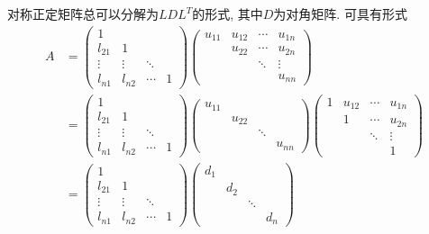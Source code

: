 \documentclass[hidelinks]{ctexart}
\begin{document}
对称正定矩阵总可以分解为$LDL^T$的形式, 其中$D$为对角矩阵. 可具有形式
\begin{align*}
    A &= \begin{pmatrix}
        1 & & & \\
        l_{21} & 1 & & \\
        \vdots & \vdots & \ddots \\
        l_{n1} & l_{n2} & \cdots & 1
    \end{pmatrix}\begin{pmatrix}
        u_{11} & u_{12} & \cdots & u_{1n} \\
        & u_{22} & \cdots & u_{2n} \\
        & & \ddots & \vdots \\
        & & & u_{nn}
    \end{pmatrix} \\
    &= \begin{pmatrix}
        1 & & & \\
        l_{21} & 1 & & \\
        \vdots & \vdots & \ddots \\
        l_{n1} & l_{n2} & \cdots & 1
    \end{pmatrix}\begin{pmatrix}
        u_{11} & & &  \\
        & u_{22} & &  \\
        & & \ddots &  \\
        & & & u_{nn}
    \end{pmatrix}\begin{pmatrix}
        1 & u_{12} & \cdots & u_{1n} \\
        & 1 & \cdots & u_{2n} \\
        & & \ddots & \vdots \\
        & & & 1
    \end{pmatrix} \\
    &= \begin{pmatrix}
        1 & & & \\
        l_{21} & 1 & & \\
        \vdots & \vdots & \ddots \\
        l_{n1} & l_{n2} & \cdots & 1
    \end{pmatrix}\begin{pmatrix}
        d_{1} & & &  \\
        & d_{2} & &  \\
        & & \ddots &  \\
        & & & d_{n}

\end{pmatrix}
\end{align*}
\end{document}
